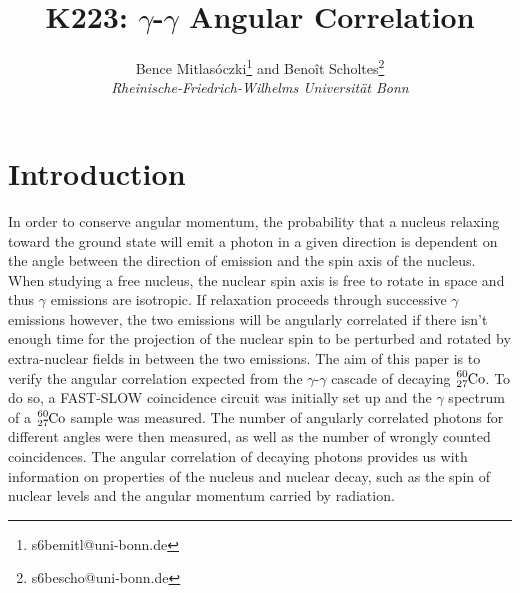 \documentclass[twocolumn]{article}
\title{\textbf{K223: $\gamma$-$\gamma$ Angular Correlation}}
\author{Bence Mitlasóczki\thanks{s6bemitl@uni-bonn.de} and Beno\^it Scholtes\thanks{s6bescho@uni-bonn.de} \\ \textit{Rheinische-Friedrich-Wilhelms Universit\"at Bonn}}
\begin{document}
\renewcommand{\abstractname}{\vspace{-\baselineskip}} %
\twocolumn[ %
\begin{@twocolumnfalse}
\maketitle
\begin{abstract} \vspace{-8mm}
This paper analyses the angular correlation between subsequent photon emissions in the $\gamma$-$\gamma$ cascade of decaying $\ce{_27^{60}Co}$. A FAST-SLOW coincidence circuit with scintillation detectors, single channel analysers, and constant fraction discriminators were used to measure the number of $\gamma$-$\gamma$ cascade decays for angular separations from 90$^\circ$ to 270$^\circ$. The data was corrected for the measured accidental coincidences. The data was in agreement with the theoretical angular correlation function and its coefficients. The fit coefficient values calculated are $B = 0.116  \pm 0.066 $ and $C = 0.040 \pm 0.075$. The large uncertainty is to be expected from previous experiments though could have been reduced with longer measuring times.
\end{abstract}
\end{@twocolumnfalse}
\hspace{5mm} ]
\maketitle
\saythanks %
\section{Introduction}
In order to conserve angular momentum, the probability that a nucleus relaxing toward the ground state will emit a photon in a given direction is dependent on the angle between the direction of emission and the spin axis of the nucleus.\cite{sieg} When studying a free nucleus, the nuclear spin axis is free to rotate in space and thus $\gamma$ emissions are isotropic. If relaxation proceeds through successive $\gamma$ emissions however, the two emissions will be angularly correlated if there isn't enough time for the projection of the nuclear spin to be perturbed and rotated by extra-nuclear fields in between the two emissions. The aim of this paper is to verify the angular correlation expected from the $\gamma$-$\gamma$ cascade of decaying $\ce{_27^{60}Co}$. To do so, a FAST-SLOW coincidence circuit was initially set up and the $\gamma$ spectrum of a $\ce{_27^{60}Co}$ sample was measured. The number of angularly correlated photons for different angles were then measured, as well as the number of wrongly counted coincidences. The angular correlation of decaying photons provides us with information on properties of the nucleus and nuclear decay, such as the spin of nuclear levels and the angular momentum carried by radiation. 
\end{document}
